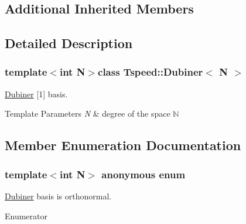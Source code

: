 \subsection*{Additional Inherited Members}


\subsection{Detailed Description}
\subsubsection*{template$<$int N$>$class Tspeed\-::\-Dubiner$<$ N $>$}

\hyperlink{classTspeed_1_1Dubiner}{Dubiner} \mbox{[}1\mbox{]} basis. 


\begin{DoxyTemplParams}{Template Parameters}
{\em N} & degree of the space $\mathbb{N}$ \\
\hline
\end{DoxyTemplParams}


\subsection{Member Enumeration Documentation}
\hypertarget{classTspeed_1_1Dubiner_aee2eaa9dbcd2aa93d7d951a9c61a10e2}{\subsubsection[{anonymous enum}]{\setlength{\rightskip}{0pt plus 5cm}template$<$int N$>$ anonymous enum}}\label{classTspeed_1_1Dubiner_aee2eaa9dbcd2aa93d7d951a9c61a10e2}


\hyperlink{classTspeed_1_1Dubiner}{Dubiner} basis is orthonormal. 

\begin{Desc}
\item[Enumerator]\par
\begin{description}
\item[{\em 
\hypertarget{classTspeed_1_1Dubiner_aee2eaa9dbcd2aa93d7d951a9c61a10e2a749d33573b6e1a4f9c56e9d5322fd70c}{is\-\_\-orthonormal}\label{classTspeed_1_1Dubiner_aee2eaa9dbcd2aa93d7d951a9c61a10e2a749d33573b6e1a4f9c56e9d5322fd70c}
}]\end{description}
\end{Desc}


